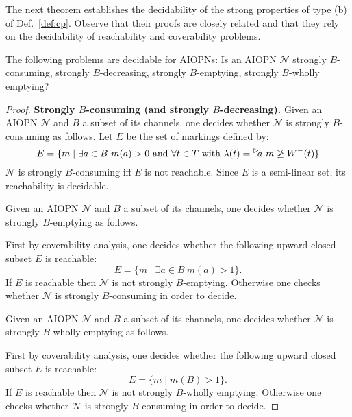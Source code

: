 The next theorem establishes the decidability of  the strong properties
of type (b) of Def.~\ref{def:cp}. 
Observe that their proofs are closely related and that they rely on the decidability
of reachability and coverability problems.
\begin{theorem}
\label{thm:strong-dec}
The following problems are decidable for AIOPNs: Is an AIOPN $\mathcal N$ 
strongly $B$-consuming,
strongly $B$-decreasing, 
strongly $B$-emptying, 
strongly $B$-wholly emptying?
\end{theorem}
\begin{proof}
	{\bf Strongly $B$-consuming (and strongly $B$-decreasing).}
	Given an AIOPN $\mathcal N$ and $B$ a subset of its channels, one
	decides whether $\mathcal N$ is strongly $B$-consuming as follows.
	Let $E$ be the set of markings defined by:\\
	\[E=\{m\mid \exists a \in B\ m(a)>0 \mbox{ and } \forall t \in T
	\mbox{ with }\lambda(t)=\inact{a}\ m\not\geq W^-(t)\}\]
	$\mathcal N$ is strongly $B$-consuming iff $E$ is not reachable.
	Since $E$ is a semi-linear set, its reachability is decidable. 


	\smallskip{} 
	Given an AIOPN $\mathcal N$ and $B$ a subset of its channels, one
	decides whether $\mathcal N$ is strongly $B$-emptying as follows.

	\smallskip\noindent
	First by coverability analysis, one decides whether the following upward closed
	subset $E$ is reachable:\\
	\[E=\{m\mid \exists a \in B\ m(a)>1\}.\]
	If $E$ is reachable then $\mathcal N$ is not strongly $B$-emptying.
	Otherwise one checks whether $\mathcal N$ is strongly $B$-consuming
	in order to decide.

	\smallskip{} 
	Given an AIOPN $\mathcal N$ and $B$ a subset of its channels, one
	decides whether $\mathcal N$ is strongly $B$-wholly emptying as follows.

	\smallskip\noindent
	First by coverability analysis, one decides whether the following upward closed
	subset $E$ is reachable:\\
	\[E=\{m\mid m(B)>1\}.\]
	If $E$ is reachable then $\mathcal N$ is not strongly $B$-wholly emptying.
	Otherwise one checks whether $\mathcal N$ is strongly $B$-consuming
	in order to decide.
\end{proof}


